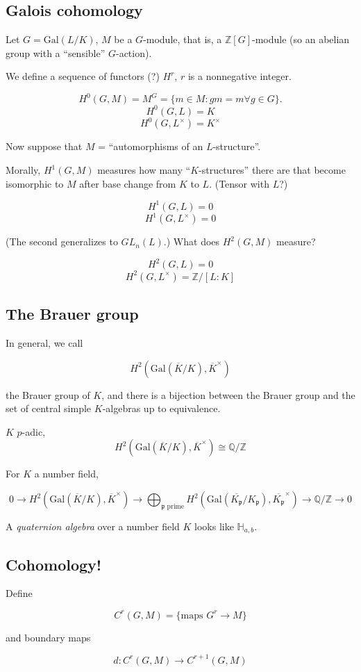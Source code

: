 \documentclass{article}
\newcommand{\Z}{\mathbb Z}
\newcommand{\Q}{\mathbb Q}
\newcommand{\gal}[2]{\text{Gal}(#1/#2)}
\newcommand{\pp}{\mathfrak p}
\newcommand{\ut}[1]{#1^\times}
\theoremstyle{definition}
\begin{document}
\subsection{Galois cohomology}
Let $G = \gal L K$, $M$ be a $G$-module, that is, a $\Z[G]$-module (so an
abelian group with a ``sensible'' $G$-action).

We define a sequence of functors (?) $H^r$, $r$ is a nonnegative integer.

$$H^0(G,M) = M^G = \{m\in M: gm = m \forall g\in G\}.$$
$$H^0(G,L) = K$$
$$H^0(G,\ut L) = \ut K$$

Now suppose that $M$ = ``automorphisms of an $L$-structure''.

Morally, $H^1(G,M)$ measures how many ``$K$-structures'' there are that become
isomorphic to $M$ after base change from $K$ to $L$. (Tensor with $L$?)

$$H^1(G,L) = 0$$
$$H^1(G,\ut L) = 0$$ 

(The second generalizes to $GL_n(L)$.) What does $H^2(G,M)$ measure?

$$H^2(G,L) = 0$$
$$H^2(G,\ut L) = \Z/[L:K]$$

\subsection{The Brauer group}
In general, we call

$$H^2(\gal {\overline K} K, \ut{\overline K})$$

the Brauer group of $K$, and there is a bijection between the Brauer group and
the set of central simple $K$-algebras up to equivalence.

$K$ $p$-adic,
$$H^2(\gal {\overline K} K, \ut{\overline K})\cong\Q/\Z$$

For $K$ a number field,

$$0\to H^2(\gal {\overline K} K, \ut{\overline K}) \to \bigoplus_{\pp \text{ prime}} H^2(\gal {\overline {K_\pp}} {K_\pp},
\ut{\overline {K_\pp}}) \to \Q/\Z \to 0$$

A \textit{quaternion algebra} over a number field $K$ looks like $\mathbb H_{a,b}$.

\subsection{Cohomology!}
Define

$$C^r(G,M) = \{\text{maps } G^r\to M\}$$

and boundary maps

$$d:C^r(G,M)\to C^{r+1}(G,M)$$
\end{document}

